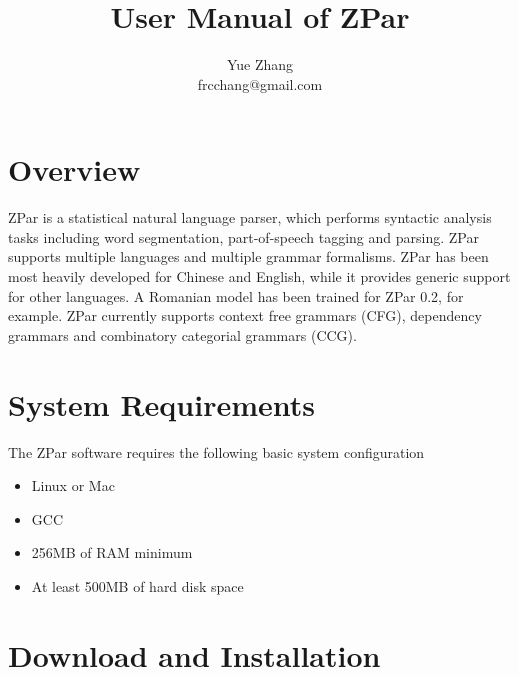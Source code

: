 \documentclass[12pt]{article}
\title{User Manual of ZPar}
\author{Yue Zhang \\
frcchang@gmail.com
}
\begin{document}
\maketitle

\section{Overview}

ZPar is a statistical natural language parser, which performs syntactic analysis tasks including word segmentation, part-of-speech tagging and parsing. ZPar supports multiple languages and multiple grammar formalisms. ZPar has been most heavily developed for Chinese and English, while it provides generic support for other languages. A Romanian model has been trained for ZPar 0.2, for example. ZPar currently supports context free grammars (CFG), dependency grammars and combinatory categorial grammars (CCG).


\section{System Requirements}
The ZPar software requires the following basic system configuration
\begin{itemize}
\item Linux or Mac
\item GCC
\item 256MB of RAM minimum
\item At least 500MB of hard disk space
\end{itemize}

\section{Download and Installation}
\end{document}

